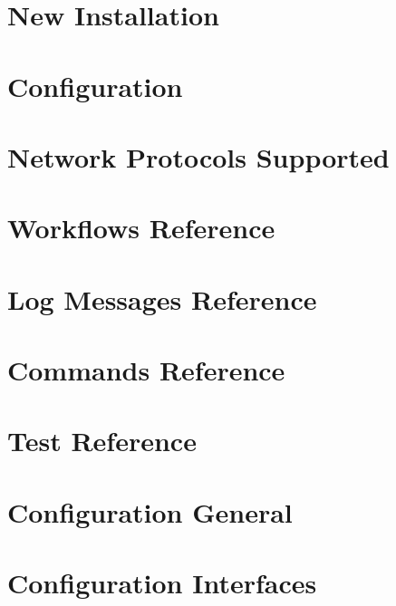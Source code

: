 \documentclass[
	oneside,
	openany,
	a4paper,
	headings=optiontoheadandtoc
	]{book}
\begin{document}
\chapter{New Installation}


%

\chapter{Configuration}


\chapter{Network Protocols Supported}


\chapter{Workflows Reference}


\chapter{Log Messages Reference}


\chapter{Commands Reference}


\chapter{Test Reference}


\appendix

\chapter{Configuration General}
 

\chapter{Configuration Interfaces}
 
\end{document}
